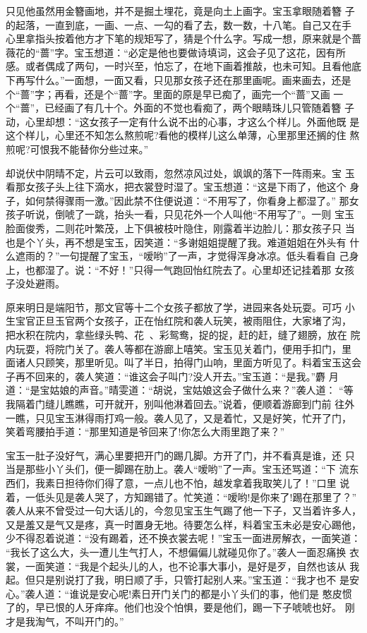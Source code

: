只见他虽然用金簪画地，并不是掘土埋花，竟是向土上画字。宝玉拿眼随着簪
子的起落，一直到底，一画、一点、一勾的看了去，数一数，十八笔。自己又在手
心里拿指头按着他方才下笔的规矩写了，猜是个什么字。写成一想，原来就是个蔷
薇花的“蔷”字。宝玉想道：“必定是他也要做诗填词，这会子见了这花，因有所
感。或者偶成了两句，一时兴至，怕忘了，在地下画着推敲，也未可知。且看他底
下再写什么。”一面想，一面又看，只见那女孩子还在那里画呢。画来画去，还是
个“蔷”字；再看，还是个“蔷”字。里面的原是早已痴了，画完一个“蔷”又画
一个“蔷”，已经画了有几十个。外面的不觉也看痴了，两个眼睛珠儿只管随着簪
子动，心里却想：“这女孩子一定有什么说不出的心事，才这么个样儿。外面他既
是这个样儿，心里还不知怎么熬煎呢?看他的模样儿这么单薄，心里那里还搁的住
熬煎呢?可恨我不能替你分些过来。”

却说伏中阴晴不定，片云可以致雨，忽然凉风过处，飒飒的落下一阵雨来。宝
玉看那女孩子头上往下滴水，把衣裳登时湿了。宝玉想道：“这是下雨了，他这个
身子，如何禁得骤雨一激。”因此禁不住便说道：“不用写了，你看身上都湿了。”
那女孩子听说，倒唬了一跳，抬头一看，只见花外一个人叫他“不用写了”。一则
宝玉脸面俊秀，二则花叶繁茂，上下俱被枝叶隐住，刚露着半边脸儿：那女孩子只
当也是个丫头，再不想是宝玉，因笑道：“多谢姐姐提醒了我。难道姐姐在外头有
什么遮雨的？”一句提醒了宝玉，“嗳哟”了一声，才觉得浑身冰凉。低头看看自
己身上，也都湿了。说：“不好！”只得一气跑回怡红院去了。心里却还记挂着那
女孩子没处避雨。

原来明日是端阳节，那文官等十二个女孩子都放了学，进园来各处玩耍。可巧
小生宝官正旦玉官两个女孩子，正在怡红院和袭人玩笑，被雨阻住，大家堵了沟，
把水积在院内，拿些绿头鸭、花、彩鸳鸯，捉的捉，赶的赶，缝了翅膀，放在
院内玩耍，将院门关了。袭人等都在游廊上嘻笑。宝玉见关着门，便用手扣门，里
面诸人只顾笑，那里听见。叫了半日，拍得门山响，里面方听见了。料着宝玉这会
子再不回来的，袭人笑道：“谁这会子叫门?没人开去。”宝玉道：“是我。”麝
月道：“是宝姑娘的声音。”晴雯道：“胡说，宝姑娘这会子做什么来？”袭人道：
“等我隔着门缝儿瞧瞧，可开就开，别叫他淋着回去。”说着，便顺着游廊到门前
往外一瞧，只见宝玉淋得雨打鸡一般。袭人见了，又是着忙，又是好笑，忙开了门，
笑着弯腰拍手道：“那里知道是爷回来了!你怎么大雨里跑了来？”

宝玉一肚子没好气，满心里要把开门的踢几脚。方开了门，并不看真是谁，还
只当是那些小丫头们，便一脚踢在肋上。袭人“嗳哟”了一声。宝玉还骂道：“下
流东西们，我素日担待你们得了意，一点儿也不怕，越发拿着我取笑儿了！”口里
说着，一低头见是袭人哭了，方知踢错了。忙笑道：“嗳哟!是你来了!踢在那里了？”
袭人从来不曾受过一句大话儿的，今忽见宝玉生气踢了他一下子，又当着许多人，
又是羞又是气又是疼，真一时置身无地。待要怎么样，料着宝玉未必是安心踢他，
少不得忍着说道：“没有踢着，还不换衣裳去呢！”宝玉一面进房解衣，一面笑道：
“我长了这么大，头一遭儿生气打人，不想偏偏儿就碰见你了。”袭人一面忍痛换
衣裳，一面笑道：“我是个起头儿的人，也不论事大事小，是好是歹，自然也该从
我起。但只是别说打了我，明日顺了手，只管打起别人来。”宝玉道：“我才也不
是安心。”袭人道：“谁说是安心呢!素日开门关门的都是小丫头们的事，他们是
憨皮惯了的，早已恨的人牙痒痒。他们也没个怕惧，要是他们，踢一下子唬唬也好。
刚才是我淘气，不叫开门的。”

